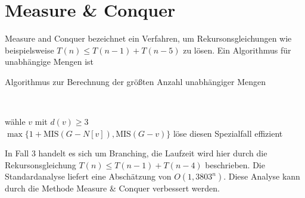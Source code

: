 \chapter{Measure \& Conquer}

  Measure and Conquer bezeichnet ein Verfahren, um Rekursonsgleichungen wie beispielsweise \(T(n) \leq T(n-1) + T(n-5)\) zu lösen. Ein Algorithmus für unabhängige Mengen ist

  \begin{algorithm}[H]
    \caption{Algorithmus zur Berechnung der größten Anzahl unabhängiger Mengen}
  
     \\

     {
      wähle \(v\) mit \(d(v) \geq 3\) \\
      \Return \(\max \{ 1 + \text{MIS}(G - N[v]), \text{MIS}(G-v) \}\) 
    } {
      löse diesen Spezialfall effizient
    }
  \end{algorithm}

  In Fall 3 handelt es sich um Branching, die Laufzeit wird hier durch die Rekursonsgleichung \(T(n) \leq T(n-1) + T(n-4)\) beschrieben. Die Standardanalyse liefert eine Abschätzung von \(O(1,3803^n)\). Diese Analyse kann durch die Methode Measure \& Conquer verbessert werden.
